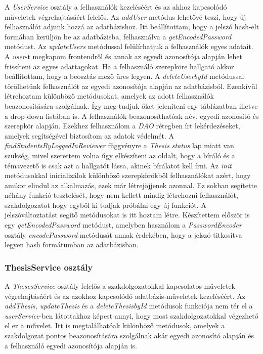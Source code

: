 A \textit{UserService} osztály a felhasználók kezeléséért és az ahhoz kapcsolódó műveletek végrehajtásáért felelős. Az \textit{addUser} metódus lehetővé teszi, hogy új felhasználót adjunk hozzá az adatbázishoz. Itt beállítottam, hogy a jelszó hash-elt formában kerüljön be az adatbázisba, felhasználva a \textit{getEncodedPassword} metódust. Az \textit{updateUsers} metódussal felülírhatjuk a felhasználók egyes adatait. A \textit{user}-t megkapom frontendről és annak az egyedi azonosítója alapján lehet frissíteni az egyes adattagokat. Ha a felhasználó szerepköre hallgató akkor beállítottam, hogy a beosztás mező üres legyen. A \textit{deleteUserbyId} metódussal törölhetünk felhasználót az egyedi azonosítója alapján az adatbázisból. Ezenkívül létrehoztam különböző metódusokat, amelyek az adott felhasználók beazonosítására szolgálnak. Így meg tudjuk őket jeleníteni egy táblázatban illetve a drop-down listában is. A felhasználók beazonosíthatóak név, egyedi azonosító és szerepkör alapján.
Ezekhez felhasználom a \textit{DAO} \cite{DAO} rétegben írt lekérdezéseket, amelyek segítségével biztosítom az adatok védelmét. A \textit{findStudentsByLoggedInReviewer} függvényre a \textit{Thesis status} lap miatt van szükség, mivel szerettem volna úgy elkészíteni az oldalt, hogy a bíráló és a témavezető is csak azt a hallgatót lássa, akinek bírálatot kell írni. Az \textit{init} metódusokkal inicializálok különböző szerepkörökből felhasználókat azért, hogy amikor elindul az alkalmazás, ezek már létrejöjjenek azonnal. Ez sokban segítette néhány funkció tesztelését, hogy nem kellett mindig létrehozni felhasználót, szakdolgozatot hogy egyből ki tudjak próbálni egy új funkciót. A jelszóváltoztatást segítő metódusokat is itt hoztam létre. Készítettem először is egy \textit{getEncodedPassword} metódust, amelyben használom a \textit{PasswordEncoder} osztály \textit{encodePassword} metódusát annak érdekében, hogy a jelszó titkosítva legyen hash formátumban az adatbázisban.

\subsubsection{ThesisService osztály}

A \textit{ThesesService} osztály felelős a szakdolgozatokkal kapcsolatos műveletek végrehajtásáért és az azokhoz kapcsolódó adatbázis-műveletek kezeléséért. Az \textit{addThesis}, \textit{updateThesis} és a \textit{deleteThesisbyId} metódusok funkciója nem tér el a \textit{userService}-ben látottakhoz képest annyi, hogy most szakdolgozatokkal végezhető el ez a művelet. Itt is megtalálhatóak különböző metódusok, amelyek a szakdolgozat pontos beazonosítására szolgálnak akár egyedi azonosító alapján és a felhasználó egyedi azonosítója alapján is.

